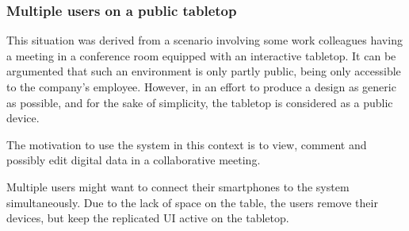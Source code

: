 

\subsubsection{Multiple users on a public tabletop}

This situation was derived from a scenario involving some work colleagues having a meeting in a conference room equipped with an interactive tabletop.
It can be argumented that such an environment is only partly public, being only accessible to the company's employee.
However, in an effort to produce a design as generic as possible, and for the sake of simplicity, the tabletop is considered as a public device.

The motivation to use the system in this context is to view, comment and possibly edit digital data in a collaborative meeting.

Multiple users might want to connect their smartphones to the system simultaneously.
Due to the lack of space on the table, the users remove their devices, but keep the replicated UI active on the tabletop.


